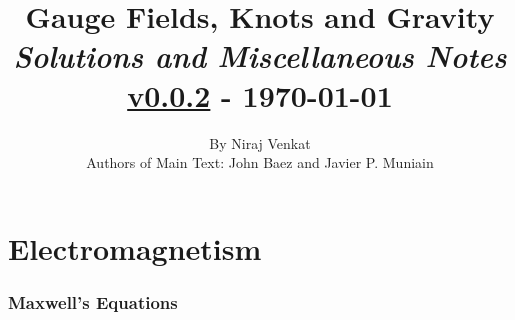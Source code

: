 \documentclass[10pt]{article}
\begin{document}
\nocite{*}

\title{{Gauge Fields, Knots and Gravity}\\{\normalsize{\itshape Solutions and Miscellaneous Notes}}\\{\normalsize{{\href{https://github.com/nirajvenkat/gfkg-nv}{v0.0.2}} - \today}}}
\author{By Niraj Venkat\\Authors of Main Text: John Baez and Javier P. Muniain}
\maketitle
\newpage
\pagestyle{fancynotes}


\part{Electromagnetism}


\section{Maxwell's Equations}\label{b1c1}
\end{document}
